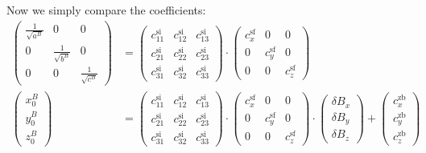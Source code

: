 Now we simply compare the coefficients:
\begin{align}
    \begin{pmatrix}
    \frac{1}{\sqrt{a^B}} & 0 & 0 \\
    0 & \frac{1}{\sqrt{b^B}} & 0 \\
    0 & 0 & \frac{1}{\sqrt{c^B}}
    \end{pmatrix}
    &=
    \begin{pmatrix}
        c^\mathrm{si}_{11} & c^\mathrm{si}_{12} & c^\mathrm{si}_{13} \\
        c^\mathrm{si}_{21} & c^\mathrm{si}_{22} & c^\mathrm{si}_{23} \\
        c^\mathrm{si}_{31} & c^\mathrm{si}_{32} & c^\mathrm{si}_{33} 
    \end{pmatrix}
    \cdot
    \begin{pmatrix}
        c^\mathrm{sf}_x & 0 & 0 \\
        0 & c^\mathrm{sf}_y & 0 \\
        0 & 0 & c^\mathrm{sf}_z
    \end{pmatrix}
    \label{eq:B:factor}
    \\
    \begin{pmatrix}
    x_0^B \\ 
    y_0^B \\ 
    z_0^B
    \end{pmatrix}
    &=
    \begin{pmatrix}
        c^\mathrm{si}_{11} & c^\mathrm{si}_{12} & c^\mathrm{si}_{13} \\
        c^\mathrm{si}_{21} & c^\mathrm{si}_{22} & c^\mathrm{si}_{23} \\
        c^\mathrm{si}_{31} & c^\mathrm{si}_{32} & c^\mathrm{si}_{33} 
    \end{pmatrix}
    \cdot
    \begin{pmatrix}
        c^\mathrm{sf}_x & 0 & 0 \\
        0 & c^\mathrm{sf}_y & 0 \\
        0 & 0 & c^\mathrm{sf}_z
    \end{pmatrix}
    \cdot
    \begin{pmatrix}
     \delta B_x \\
     \delta B_y \\
     \delta B_z   
    \end{pmatrix}
    +\begin{pmatrix}
        c^{\mathrm{zb}}_x \\
        c^{\mathrm{zb}}_y \\
        c^{\mathrm{zb}}_z 
    \end{pmatrix}
    \label{eq:B:linear}
\end{align}

